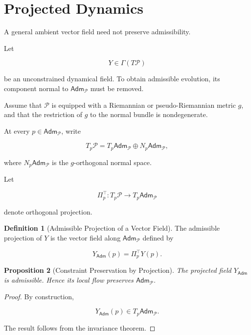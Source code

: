 \documentclass[11pt,oneside]{book}
\numberwithin{equation}{chapter}
\theoremstyle{definition}
\newtheorem{definition}{Definition}[chapter]
\theoremstyle{plain}
\newtheorem{proposition}[definition]{Proposition}
\newcommand{\Adm}{\mathsf{Adm}}
\begin{document}
\section{Projected Dynamics}

A general ambient vector field need not preserve admissibility.

Let

\[
Y\in\Gamma(T\mathcal P)
\]

be an unconstrained dynamical field. To obtain admissible evolution, its
component normal to \(\Adm_{\mathcal P}\) must be removed.

Assume that \(\mathcal P\) is equipped with a Riemannian or
pseudo-Riemannian metric \(g\), and that the restriction of \(g\) to the
normal bundle is nondegenerate.

At every \(p\in\Adm_{\mathcal P}\), write

\[
T_p\mathcal P
=
T_p\Adm_{\mathcal P}
\oplus
N_p\Adm_{\mathcal P},
\]

where \(N_p\Adm_{\mathcal P}\) is the \(g\)-orthogonal normal space.

Let

\[
\Pi_p^{\top}:
T_p\mathcal P
\longrightarrow
T_p\Adm_{\mathcal P}
\]

denote orthogonal projection.

\begin{definition}[Admissible Projection of a Vector Field]

The admissible projection of \(Y\) is the vector field along
\(\Adm_{\mathcal P}\) defined by

\[
Y_{\Adm}(p)
=
\Pi_p^{\top}Y(p).
\]

\end{definition}

\begin{proposition}[Constraint Preservation by Projection]

The projected field \(Y_{\Adm}\) is admissible. Hence its local flow
preserves \(\Adm_{\mathcal P}\).

\end{proposition}

\begin{proof}

By construction,

\[
Y_{\Adm}(p)
\in
T_p\Adm_{\mathcal P}.
\]

The result follows from the invariance theorem.

\end{proof}
\end{document}
